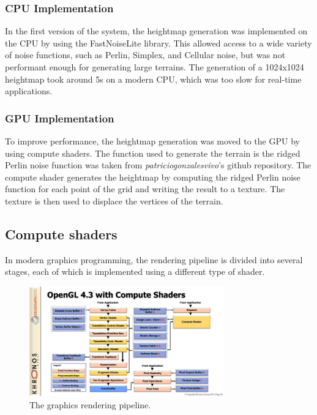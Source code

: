 \documentclass{article}
\begin{document}
\subsubsection{CPU Implementation}
In the first version of the system, the heightmap generation was implemented on the CPU by using
the FastNoiseLite library. This allowed access to a wide variety of noise functions, such as
Perlin, Simplex, and Cellular noise, but was not performant enough for generating large terrains.
The generation of a 1024x1024 heightmap took around 5s on a modern CPU, which was too slow for
real-time applications.
\subsubsection{GPU Implementation}
To improve performance, the heightmap generation was moved to the GPU by using compute shaders.
The function used to generate the terrain is the ridged Perlin noise function was taken from 
\textit{patriciogonzalesvivo}'s github repository. The compute shader generates the heightmap by
computing the ridged Perlin noise function for each point of the grid and writing the result to a
texture. The texture is then used to displace the vertices of the terrain.

\subsection{Compute shaders}
In modern graphics programming, the rendering pipeline is divided into several stages, each of
which is implemented using a different type of shader.

\begin{figure}[H]
	\centering
	\includegraphics[width=0.75\textwidth]{img/compute_shaders.jpg}
	\caption{The graphics rendering pipeline.}
	\label{fig:pipeline}
\end{figure}
\end{document}
